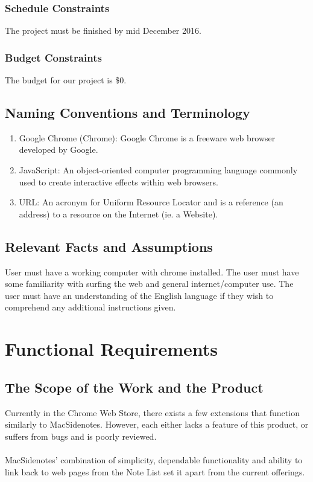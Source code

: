 \documentclass[12pt, titlepage]{article}
\begin{document}
\subsubsection{Schedule Constraints}
The project must be finished by mid December 2016.

\subsubsection{Budget Constraints}
The budget for our project is \$0.



\subsection{Naming Conventions and Terminology}

\begin{enumerate}
	\item Google Chrome (Chrome): Google Chrome is a freeware web browser developed 
	by Google.
	\item JavaScript: An object-oriented computer programming language commonly used 
	to create interactive effects within web browsers.
	\item URL: An acronym for Uniform Resource Locator and is a reference (an 
	address) to a resource on the Internet (ie. a Website). 
\end{enumerate}

\subsection{Relevant Facts and Assumptions}

User must have a working computer with chrome installed. The user must have some 
familiarity with surfing the web and general internet/computer use. The user must have an 
understanding of the English language if they wish to comprehend any additional 
instructions given. 

\section{Functional Requirements}

\subsection{The Scope of the Work and the Product}

Currently in the Chrome Web Store, there exists a few extensions that function 
similarly to MacSidenotes. However, each either lacks a feature of this 
product, or suffers from bugs and is poorly reviewed.\\
\\
MacSidenotes' combination of simplicity, dependable functionality and ability 
to link back to web pages from the Note List set it apart from the current 
offerings.
\end{document}
